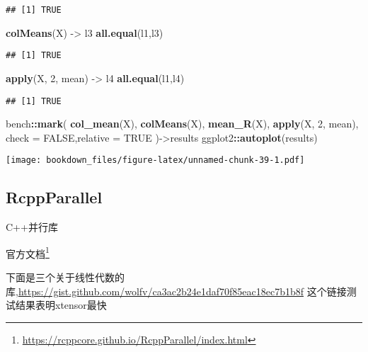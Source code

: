 \documentclass[]{ctexbook}
\newenvironment{Shaded}{\begin{snugshade}}{\end{snugshade}}
\newcommand{\DataTypeTok}[1]{\textcolor[rgb]{0.13,0.29,0.53}{#1}}
\newcommand{\DecValTok}[1]{\textcolor[rgb]{0.00,0.00,0.81}{#1}}
\newcommand{\KeywordTok}[1]{\textcolor[rgb]{0.13,0.29,0.53}{\textbf{#1}}}
\newcommand{\NormalTok}[1]{#1}
\newcommand{\OperatorTok}[1]{\textcolor[rgb]{0.81,0.36,0.00}{\textbf{#1}}}
\newcommand{\OtherTok}[1]{\textcolor[rgb]{0.56,0.35,0.01}{#1}}
\newcommand{\StringTok}[1]{\textcolor[rgb]{0.31,0.60,0.02}{#1}}
\renewcommand{\href}[2]{#2\footnote{\url{#1}}}
\begin{document}
\begin{verbatim}
## [1] TRUE
\end{verbatim}

\begin{Shaded}
\begin{Highlighting}[]
\KeywordTok{colMeans}\NormalTok{(X) ->}\StringTok{ }\NormalTok{l3}
\KeywordTok{all.equal}\NormalTok{(l1,l3)}
\end{Highlighting}
\end{Shaded}

\begin{verbatim}
## [1] TRUE
\end{verbatim}

\begin{Shaded}
\begin{Highlighting}[]
\KeywordTok{apply}\NormalTok{(X, }\DecValTok{2}\NormalTok{, mean) ->}\StringTok{ }\NormalTok{l4}
\KeywordTok{all.equal}\NormalTok{(l1,l4)}
\end{Highlighting}
\end{Shaded}

\begin{verbatim}
## [1] TRUE
\end{verbatim}

\begin{Shaded}
\begin{Highlighting}[]
\NormalTok{bench}\OperatorTok{::}\KeywordTok{mark}\NormalTok{(}
  \KeywordTok{col_mean}\NormalTok{(X),}
  \KeywordTok{colMeans}\NormalTok{(X),}
  \KeywordTok{mean_R}\NormalTok{(X),}
  \KeywordTok{apply}\NormalTok{(X, }\DecValTok{2}\NormalTok{, mean),}
  \DataTypeTok{check =} \OtherTok{FALSE}\NormalTok{,}\DataTypeTok{relative =} \OtherTok{TRUE}
\NormalTok{)->results}
\NormalTok{ggplot2}\OperatorTok{::}\KeywordTok{autoplot}\NormalTok{(results)}
\end{Highlighting}
\end{Shaded}

\texttt{[image: bookdown\_files/figure-latex/unnamed-chunk-39-1.pdf]}

\hypertarget{rcppparallel}{%
\subsection{RcppParallel}\label{rcppparallel}}

C++并行库

\href{https://rcppcore.github.io/RcppParallel/index.html}{官方文档}

下面是三个关于线性代数的库,\url{https://gist.github.com/wolfv/ca3ac2b24e1daf70f85eac18ec7b1b8f}
这个链接测试结果表明xtensor最快
\end{document}
